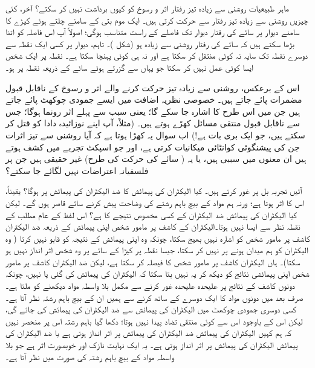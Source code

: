 ماہر طبیعیات روشنی سے زیادہ تیز رفتار اثر و رسوخ کو کیوں برداشت نہیں کر سکتے؟ آخر، کئی چیزیں روشنی سے زیادہ تیز رفتار سے حرکت کرتی ہیں۔ ایک موم بتی کے سامنے چلتے ہوئے کیڑے کا سامنے دیوار پر سائے کی رفتار دیوار تک فاصلے کے راست متناسب ہوگی؛ اصولاً آپ اس فاصلہ کو اتنا بڑھا سکتے ہیں کہ سائے کی رفتار روشنی سے زیادہ ہو (شکل )۔ تاہم، دیوار پر کسی ایک نقطہ سے دوسرے نقطہ تک سایہ نہ کوئی  منتقل کر سکتا ہے اور نہ ہی کوئی  پہنچا سکتا ہے۔ نقطہ  پر ایک شخص ایسا کوئی عمل نہیں کر سکتا جو یہاں سے گزرتے ہوئے سائے کے ذریعہ نقطہ  پر  ہو۔


اس کے برعکس، روشنی سے زیادہ تیز حرکت کرنے والے  اثر و رسوخ کے ناقابل قبول مضمرات پائے جاتے ہیں۔ خصوصی نظریہ اضافت میں ایسے جمودی چوکھٹ پائے جاتے ہیں جن میں اس طرح کا اشارہ  جا سکے گا؛ یعنی سبب سے پہلے اثر رونما ہوگا؛ جس سے ناقابل قبول منتقی مسائل کھڑے ہوتے ہیں۔ (مثلاً، آپ اپنے نوزائیدہ دادا کو قتل کر سکتے ہیں، جو ایک بری بات ہے!) اب سوال یہ کھڑا ہوتا ہے کہ آیا روشنی سے تیز اثرات جن کی پیشنگوئی کوانٹائی میکانیات کرتی ہے، اور جو اسپکٹ تجربے میں کشف ہوتے ہیں ان معنوں میں سببی ہیں، یا یہ ( سائے کی حرکت کی طرح) غیر حقیقی ہیں جن پر فلسفیانہ اعتراضات نہیں لگائے جا سکتے؟

آئیں تجربہ بل پر غور کرتے ہیں۔ کیا الیکٹران کی پیمائش کا ضد الیکٹران کی پیمائش پر  ہوگا؟ یقیناً، اس کا اثر ہوتا ہے؛ ورنہ ہم مواد کے بیچ باہم رشتے کی وضاحت پیش کرنے سائے قاصر ہوں گے۔ لیکن کیا الیکٹران کی پیمائش ضد الیکٹران کے کسی مخصوص نتیجے کا  ہے؟ اس لفظ کے عام مطلب کے نقطہ نظر سے ایسا نہیں ہوتا۔الیکٹران کے کاشف پر مامور شخص اپنی پیمائش کے ذریعہ ضد الیکٹران کاشف پر مامور شخص کو اشارہ نہیں بھیج سکتا، چونکہ وہ اپنی پیمائش کے نتیجہ کو قابو نہیں کرتا ( وہ الیکٹران کو ہم میدان ہونے پر  نہیں کر سکتا، جیسا نقطہ  پر کیڑا کے سائے پر وہ شخص اثر انداز نہیں ہو سکتا)۔ ہاں الیکٹران کاشف پر مامور شخص  کا فیصلہ کر سکتا ہے، لیکن ضد الیکٹران کاشف پر مامور شخص اپنی پیمائشی نتائج کو دیکھ کر یہ نہیں بتا سکتا کہ الیکٹران کی پیمائش کی گئی یا نہیں، چونکہ دونوں کاشف کے نتائج پر علیحدہ علیحدہ غور کرنے سے مکمل بلا واسطہ مواد دیکھنے کو ملتا ہے۔ صرف بعد میں دونوں مواد کا ایک دوسرے کے ساتھ  کرنے سے ہمیں ان کے بیچ باہم رشتہ نظر آتا ہے۔ کسی دوسری جمودی چوکھٹ میں الیکٹران کی پیمائش سے  ضد الیکٹران کی پیمائش کی جائے گی، لیکن اس کے باوجود اس سے کوئی منتقی تضاد پیدا نہیں ہوتا؛ دکھا گیا باہم رشتہ اس پر منحصر نہیں کہ ہم کہیں الیکٹران کی پیمائش ضد الیکٹران کی پیمائش پر اثر انداز ہوتی ہے یا ضد الیکٹران کی پیمائش الیکٹران کی پیمائش پر اثر انداز ہوتی ہے۔ یہ ایک نہایت نازک اور خوبصورت اثر ہے جو بلا واسطہ مواد کے بیچ باہم رشتہ کی صورت میں نظر آتا ہے۔

